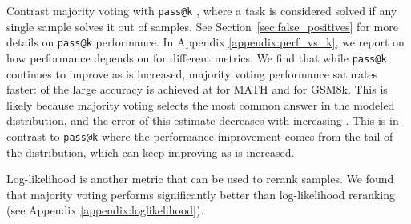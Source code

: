 \documentclass{article}
\makeatletter
\newcommand{\passk}[0]{{\texttt{pass@k} }}
\makeatother
\begin{document}
Contrast majority voting with \passk\!, where a task is considered solved if any single sample solves it out of  samples. See Section~\ref{sec:false_positives} for more details on \passk performance.
In Appendix \ref{appendix:perf_vs_k},
we report on how performance depends on  for different metrics. 
We find that while \passk continues to improve as  is increased, majority voting performance saturates faster:  of the large  accuracy is achieved at  for MATH and  for GSM8k. This is likely because majority voting selects the most common answer in the modeled distribution, and the error of this estimate decreases with increasing . This is in contrast to \passk where the performance improvement comes from the tail of the distribution, which can keep improving as  is increased.

Log-likelihood is another metric that can be used to rerank samples. We found that majority voting performs significantly better than log-likelihood reranking (see Appendix \ref{appendix:loglikelihood}).
\end{document}
